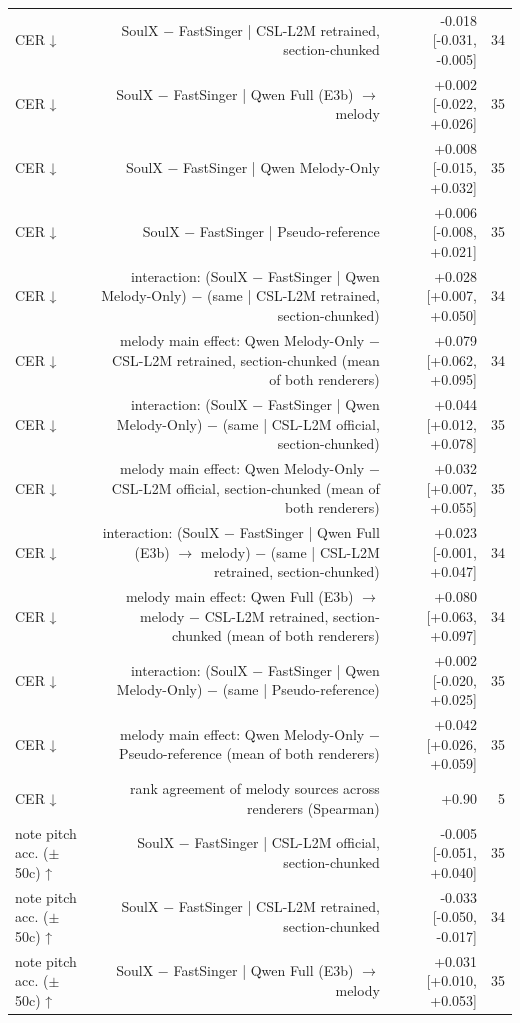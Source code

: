 \begin{table}[t]
\begin{tabular}{lrrr}
CER ↓ & SoulX $-$ FastSinger | CSL-L2M retrained, section-chunked & -0.018 [-0.031, -0.005] & 34 \\
CER ↓ & SoulX $-$ FastSinger | Qwen Full (E3b) $\rightarrow$ melody & +0.002 [-0.022, +0.026] & 35 \\
CER ↓ & SoulX $-$ FastSinger | Qwen Melody-Only & +0.008 [-0.015, +0.032] & 35 \\
CER ↓ & SoulX $-$ FastSinger | Pseudo-reference & +0.006 [-0.008, +0.021] & 35 \\
CER ↓ & interaction: (SoulX $-$ FastSinger | Qwen Melody-Only) $-$ (same | CSL-L2M retrained, section-chunked) & +0.028 [+0.007, +0.050] & 34 \\
CER ↓ & melody main effect: Qwen Melody-Only $-$ CSL-L2M retrained, section-chunked (mean of both renderers) & +0.079 [+0.062, +0.095] & 34 \\
CER ↓ & interaction: (SoulX $-$ FastSinger | Qwen Melody-Only) $-$ (same | CSL-L2M official, section-chunked) & +0.044 [+0.012, +0.078] & 35 \\
CER ↓ & melody main effect: Qwen Melody-Only $-$ CSL-L2M official, section-chunked (mean of both renderers) & +0.032 [+0.007, +0.055] & 35 \\
CER ↓ & interaction: (SoulX $-$ FastSinger | Qwen Full (E3b) $\rightarrow$ melody) $-$ (same | CSL-L2M retrained, section-chunked) & +0.023 [-0.001, +0.047] & 34 \\
CER ↓ & melody main effect: Qwen Full (E3b) $\rightarrow$ melody $-$ CSL-L2M retrained, section-chunked (mean of both renderers) & +0.080 [+0.063, +0.097] & 34 \\
CER ↓ & interaction: (SoulX $-$ FastSinger | Qwen Melody-Only) $-$ (same | Pseudo-reference) & +0.002 [-0.020, +0.025] & 35 \\
CER ↓ & melody main effect: Qwen Melody-Only $-$ Pseudo-reference (mean of both renderers) & +0.042 [+0.026, +0.059] & 35 \\
CER ↓ & rank agreement of melody sources across renderers (Spearman) & +0.90 & 5 \\
note pitch acc. ($\pm$50c) ↑ & SoulX $-$ FastSinger | CSL-L2M official, section-chunked & -0.005 [-0.051, +0.040] & 35 \\
note pitch acc. ($\pm$50c) ↑ & SoulX $-$ FastSinger | CSL-L2M retrained, section-chunked & -0.033 [-0.050, -0.017] & 34 \\
note pitch acc. ($\pm$50c) ↑ & SoulX $-$ FastSinger | Qwen Full (E3b) $\rightarrow$ melody & +0.031 [+0.010, +0.053] & 35 \\

\end{tabular}
\end{table}
